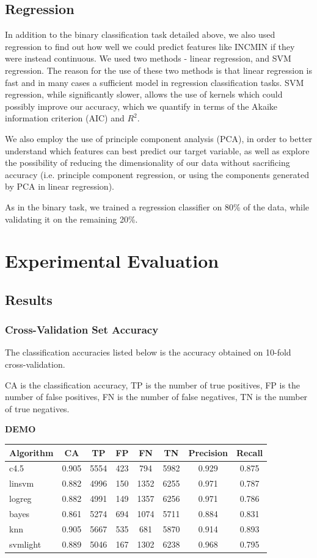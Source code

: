 \documentclass[11pt,letter]{article}
\begin{document}
\subsection{Regression}
In addition to the binary classification task detailed above, we also used regression to find out how well we could predict features like INCMIN if they were instead continuous. We used two methods - linear regression, and SVM regression. The reason for the use of these two methods is that linear regression is fast and in many cases a sufficient model in regression classification tasks. SVM regression, while significantly slower, allows the use of kernels which could possibly improve our accuracy, which we quantify in terms of the Akaike information criterion (AIC) and $R^2$.

We also employ the use of principle component analysis (PCA), in order to better understand which features can best predict our target variable, as well as explore the possibility of reducing the dimensionality of our data without sacrificing accuracy (i.e. principle component regression, or using the components generated by PCA in linear regression).

As in the binary task, we trained a regression classifier on 80\% of the data, while validating it on the remaining 20\%.

\section{Experimental Evaluation}
\subsection{Results}
\subsubsection{Cross-Validation Set Accuracy}
The classification accuracies listed below is the accuracy obtained on 10-fold cross-validation.

CA is the classification accuracy, TP is the number of true positives, FP is the number of false positives, FN is the number of false negatives, TN is the number of true negatives.

\textbf{DEMO} \\
\begin{tabular}{|l|c|c|c|c|c|c|c|}
\hline
Algorithm & CA & TP & FP & FN & TN & Precision & Recall\\
\hline
c4.5   	 & 0.905 & 5554  & 423  &  794   & 5982 & 0.929 & 0.875\\
linsvm 	 & 0.882 & 4996  & 150  &  1352  & 6255 & 0.971 & 0.787\\
logreg 	 & 0.882 & 4991  & 149  &  1357  & 6256 & 0.971 & 0.786\\
bayes  	 & 0.861 & 5274  & 694  &  1074  & 5711 & 0.884 & 0.831\\
knn   & 0.905 & 5667  & 535  &  681   & 5870 & 0.914 & 0.893\\
svmlight & 0.889 & 5046  & 167	&  1302	 & 6238 & 0.968 & 0.795\\ 
\hline
\end{tabular}
\end{document}
